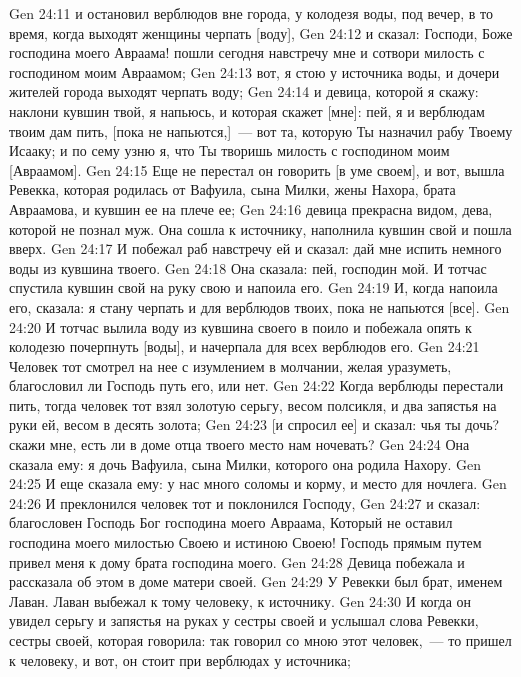 \vs Gen 24:11 и остановил верблюдов вне города, у колодезя воды, под вечер, в то время, когда выходят женщины черпать [воду],
\vs Gen 24:12 и сказал: Господи, Боже господина моего Авраама! пошли  сегодня навстречу мне и сотвори милость с господином моим Авраамом;
\vs Gen 24:13 вот, я стою у источника воды, и дочери жителей города выходят черпать воду;
\vs Gen 24:14 и девица, которой я скажу: наклони кувшин твой, я напьюсь, и которая скажет [мне]: пей, я и верблюдам твоим дам пить, [пока не напьются,]~--- вот та, которую Ты назначил рабу Твоему Исааку; и по сему узню я, что Ты творишь милость с господином моим [Авраамом].
\vs Gen 24:15 Еще не перестал он говорить [в уме своем], и вот, вышла Ревекка, которая родилась от Вафуила, сына Милки, жены Нахора, брата Авраамова, и кувшин ее на плече ее;
\vs Gen 24:16 девица  прекрасна видом, дева, которой не познал муж. Она сошла к источнику, наполнила кувшин свой и пошла вверх.
\vs Gen 24:17 И побежал раб навстречу ей и сказал: дай мне испить немного воды из кувшина твоего.
\vs Gen 24:18 Она сказала: пей, господин мой. И тотчас спустила кувшин свой на руку свою и напоила его.
\vs Gen 24:19 И, когда напоила его, сказала: я стану черпать и для верблюдов твоих, пока не напьются [все].
\vs Gen 24:20 И тотчас вылила воду из кувшина своего в поило и побежала опять к колодезю почерпнуть [воды], и начерпала для всех верблюдов его.
\vs Gen 24:21 Человек тот смотрел на нее с изумлением в молчании, желая уразуметь, благословил ли Господь путь его, или нет.
\vs Gen 24:22 Когда верблюды перестали пить, тогда человек тот взял золотую серьгу, весом полсикля, и два запястья на руки ей, весом в десять  золота;
\vs Gen 24:23 [и спросил ее] и сказал: чья ты дочь? скажи мне, есть ли в доме отца твоего место нам ночевать?
\vs Gen 24:24 Она сказала ему: я дочь Вафуила, сына Милки, которого она родила Нахору.
\vs Gen 24:25 И еще сказала ему: у нас много соломы и корму, и  место для ночлега.
\vs Gen 24:26 И преклонился человек тот и поклонился Господу,
\vs Gen 24:27 и сказал: благословен Господь Бог господина моего Авраама, Который не оставил господина моего милостью Своею и истиною Своею! Господь прямым путем привел меня к дому брата господина моего.
\vs Gen 24:28 Девица побежала и рассказала об этом в доме матери своей.
\vs Gen 24:29 У Ревекки был брат, именем Лаван. Лаван выбежал к тому человеку, к источнику.
\vs Gen 24:30 И когда он увидел серьгу и запястья на руках у сестры своей и услышал слова Ревекки, сестры своей, которая говорила: так говорил со мною этот человек,~--- то пришел к человеку, и вот, он стоит при верблюдах у источника;
